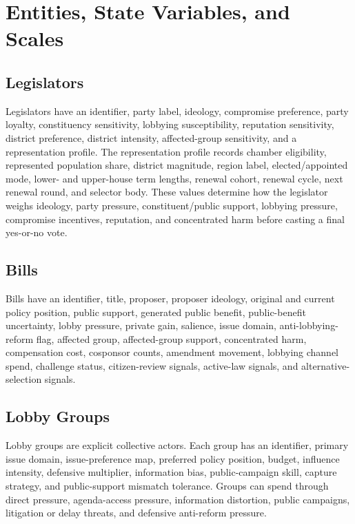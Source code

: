 \documentclass[manuscript,review,anonymous]{acmart}
\begin{document}
\section{Entities, State Variables, and Scales}

\subsection{Legislators}

Legislators have an identifier, party label, ideology, compromise preference, party loyalty, constituency sensitivity, lobbying susceptibility, reputation sensitivity, district preference, district intensity, affected-group sensitivity, and a representation profile. The representation profile records chamber eligibility, represented population share, district magnitude, region label, elected/appointed mode, lower- and upper-house term lengths, renewal cohort, renewal cycle, next renewal round, and selector body. These values determine how the legislator weighs ideology, party pressure, constituent/public support, lobbying pressure, compromise incentives, reputation, and concentrated harm before casting a final yes-or-no vote.

\subsection{Bills}

Bills have an identifier, title, proposer, proposer ideology, original and current policy position, public support, generated public benefit, public-benefit uncertainty, lobby pressure, private gain, salience, issue domain, anti-lobbying-reform flag, affected group, affected-group support, concentrated harm, compensation cost, cosponsor counts, amendment movement, lobbying channel spend, challenge status, citizen-review signals, active-law signals, and alternative-selection signals.

\subsection{Lobby Groups}

Lobby groups are explicit collective actors. Each group has an identifier, primary issue domain, issue-preference map, preferred policy position, budget, influence intensity, defensive multiplier, information bias, public-campaign skill, capture strategy, and public-support mismatch tolerance. Groups can spend through direct pressure, agenda-access pressure, information distortion, public campaigns, litigation or delay threats, and defensive anti-reform pressure.
\end{document}
